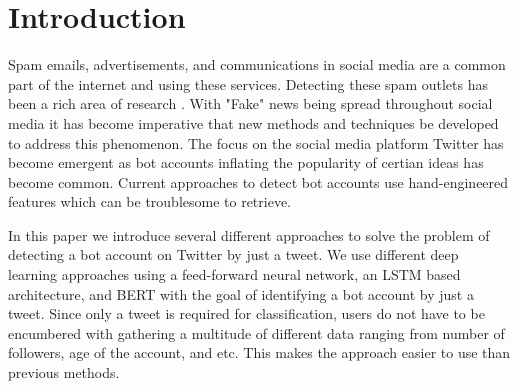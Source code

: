 \section{Introduction}
\label{sec:introduction}

Spam emails, advertisements, and communications in social media are a
common part of the internet and using these services. Detecting these
spam outlets has been a rich area of research
\citep{Cormack:2008:ESF:1454707.1454708,
DBLP:journals/corr/cs-CL-0009009, Androutsopoulos2006LearningTF,
Bickel:2006:DSF:2976456.2976477, Bratko:2006:SFU:1248547.1248644,
Solan:inproceedings, Cresci:2017:PSS:3041021.3055135, fameforsale2015,
INUWADUTSE2018496, FM2793, 8424744}.  With "Fake" news being spread
throughout social media \citep{NBERw25223} it has become imperative
that new methods and techniques be developed to address this
phenomenon. The focus on the social media platform Twitter has become
emergent \citep{8424744, FM2793, INUWADUTSE2018496,
Cresci:2017:PSS:3041021.3055135, fameforsale2015} as bot accounts
inflating the popularity of certian ideas has become common. Current
approaches to detect bot accounts use hand-engineered features which
can be troublesome to retrieve.

In this paper we introduce several different approaches to solve the
problem of detecting a bot account on Twitter by just a tweet. We use
different deep learning approaches using a feed-forward neural
network, an LSTM based architecture, and BERT with the goal of
identifying a bot account by just a tweet. Since only a tweet is
required for classification, users do not have to be encumbered with
gathering a multitude of different data ranging from number of
followers, age of the account, and etc. This makes the approach easier
to use than previous methods.
